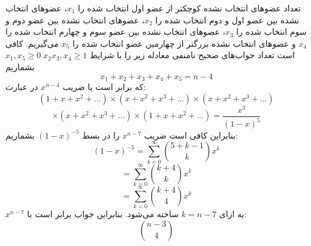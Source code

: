 \p
تعداد عضو‌های  انتخاب نشده کوچکتر از عضو اول انتخاب شده را 
                $x_1$،
                عضوهای انتخاب نشده بین عضو اول و دوم انتخاب شده را
                $x_2$،
                عضو‌های انتخاب نشده بین عضو دوم و سوم انتخاب شده را
                $x_3$،
                عضو‌های انتخاب نشده بین عضو سوم و چهارم انتخاب شده را
                $x_4$ و
                عضوهای انتخاب نشده بزرگتر از چهارمین عضو انتخاب شده را 
                $x_5$
                می‌گیریم. کافی است تعداد جواب‌های صحیح نامنفی معادله زیر را با شرایط 
                $x_1, x_5 \geq 0 \; x_2 x_3, x_4 \geq 1$
                بشماریم
                $$x_1 + x_2 + x_3 + x_4 + x_5 = n - 4$$
                که برابر است با ضریب
                $x^{n - 4}$
                در عبارت:
                $$(1 + x + x^2 + ...)\times(x + x^2 + x^3 + ...)\times(x + x^2 + x^3 + ...)$$
                $$\times(x + x^2 + x^3 + ...)\times(1 + x + x^2 + ...) = \frac{x^3}{(1 - x)^5}$$
                 بنابراین کافی است ضریب $x^{n - 7}$ را در بسط $(1 - x)^{-5}$ بشماریم:
                    $$(1 - x)^{-5} = \sum_{k = 0}^{\infty} \binom{5 + k - 1}{k}x^k$$
                    $$= \sum_{k = 0}^{\infty} \binom{k + 4}{k}x^k$$
                    $$= \sum_{k = 0}^{\infty} \binom{k + 4}{4}x^k$$
                $x^{n - 7}$ به ازای $k = n -7$ ساخته می‌شود. بنابراین جواب برابر است با:
                    $$\binom{n - 3}{4}$$